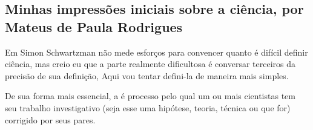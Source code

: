 \subsection{Minhas impressões iniciais sobre a ciência, por Mateus de Paula Rodrigues}

Em \citep{schwartzman_ciencia_1984} Simon Schwartzman não mede esforços para convencer quanto é difícil definir ciência, mas creio eu que a parte realmente dificultosa é conversar terceiros da precisão de sua definição, Aqui vou tentar defini-la de maneira mais simples.

De sua forma mais essencial, a  é processo pelo qual um ou mais cientistas tem seu trabalho investigativo (seja esse uma hipótese, teoria, técnica ou que for) corrigido por seus pares.